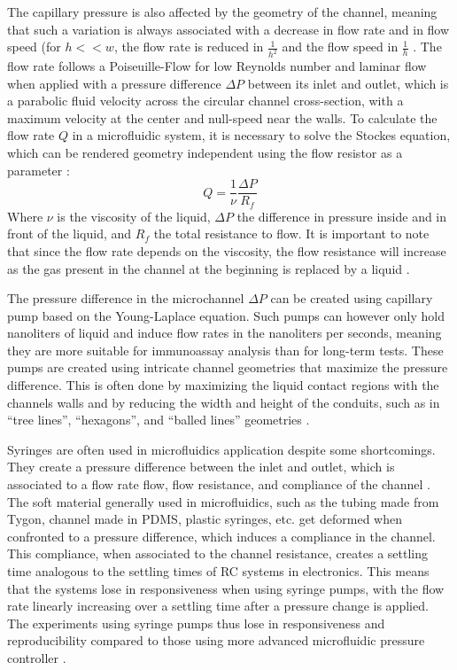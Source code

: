 The capillary pressure is also affected by the geometry of the channel, meaning that such a variation is always associated with a decrease in flow rate and in flow speed (for $h<<w$, the flow rate is reduced in $\frac{1}{h^2}$ and the flow speed in $\frac{1}{h}$ \cite{lagerstrom1996laminar,bruus2011theoretical}. The flow rate follows a Poiseuille-Flow for low Reynolds number and laminar flow when applied with a pressure difference $\Delta P$ between its inlet and outlet, which is a parabolic fluid velocity across the circular channel cross-section, with a maximum velocity at the center and null-speed near the walls. To calculate the flow rate $Q$ in a microfluidic system, it is necessary to solve the Stockes equation, which can be rendered geometry independent using the flow resistor as a parameter \cite{bruus2011theoretical,Zimmermann2007}: 
\begin{equation}
   Q = \frac{1}{\nu} \frac{\Delta P}{R_f}
\end{equation}
Where $\nu$ is the viscosity of the liquid, $\Delta P$ the difference in pressure inside and in front of the liquid, and $R_f$ the total resistance to flow. It is important to note that since the flow rate depends on the viscosity, the flow resistance will increase as the gas present in the channel at the beginning is replaced by a liquid \cite{bruus2011theoretical,Zimmermann2007}. \par

The pressure difference in the microchannel $\Delta P$ can be created using capillary pump based on the Young-Laplace equation. Such pumps can however only hold nanoliters of liquid and induce flow rates in the nanoliters per seconds, meaning they are more suitable for immunoassay analysis than for long-term tests. These pumps are created using intricate channel geometries that maximize the pressure difference. This is often done by maximizing the liquid contact regions with the channels walls and by reducing the width and height of the conduits, such as in “tree lines”, “hexagons”, and “balled lines” geometries \cite{bruus2011theoretical,Zimmermann2007}. \par

Syringes are often used in microfluidics application despite some shortcomings. They create a pressure difference between the inlet and outlet, which is associated to a flow rate flow, flow resistance, and compliance of the channel \cite{SyringePumps,bruus2011theoretical}. The soft material generally used in microfluidics, such as the tubing made from Tygon, channel made in PDMS, plastic syringes, etc. get deformed when confronted to a pressure difference, which induces a compliance in the channel. This compliance, when associated to the channel resistance, creates a settling time analogous to the settling times of RC systems in electronics. This means that the systems lose in responsiveness when using syringe pumps, with the flow rate linearly increasing over a settling time after a pressure change is applied. The experiments using syringe pumps thus lose in responsiveness and reproducibility compared to those using more advanced microfluidic pressure controller \cite{SyringePumps,Olanrewaju2018,bruus2011theoretical}. \par


